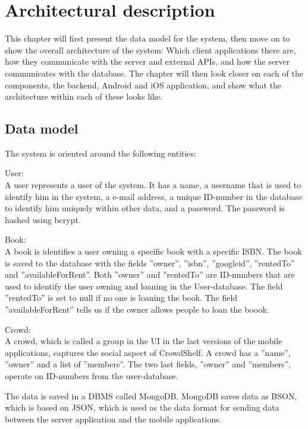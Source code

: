 \chapter{Architectural description} \label{chap:ArchitecturalDescription}

This chapter will first present the data model for the system, then move on to show the overall architecture of the system: Which client applications there are, how they communicate with the server and external APIs, and how the server communicates with the database. The chapter will then look closer on each of the components, the backend, Android and iOS application, and show what the architecture within each of these looks like. 
\section{Data model}
The system is oriented around the following entities:
\begin{description}
    \item{User: } \\
        A user represents a user of the system. It has a name, a username that is used to identify him in the system, a e-mail address, a unique \gls{ID}-number in the database to identify him uniquely within other data, and a password. The password is hashed using bcrypt. \cite{bcrypt}
    \item{Book: } \\ 
        A book is identifies a user owning a specific book with a specific \gls{ISBN}. The book is saved to the database with the fields ''owner'', ''isbn'', ''googleid'', ''rentedTo'' and ''availableForRent''. Both ''owner'' and ''rentedTo'' are \gls{ID}-numbers that are used to identify the user owning and loaning in the User-database. The field ''rentedTo'' is set to null if no one is loaning the book. The field ''availableForRent'' tells us if the owner allows people to loan the boook.
    \item{Crowd: } \\ 
        A crowd, which is called a group in the \gls{UI} in the last versions of the mobile applications, captures the social aspect of CrowdShelf. A crowd has a ''name'', ''owner'' and a list of ''members''. The two last fields, ''owner'' and ''members'', operate on \gls{ID}-numbers from the user-database. 
\end{description}

The data is saved in a \gls{DBMS} called MongoDB. \cite{mongodb} MongoDB saves data as \gls{BSON}, which is based on \gls{JSON}, which is used as the data format for sending data between the server application and the mobile applications. \cite{bson}

